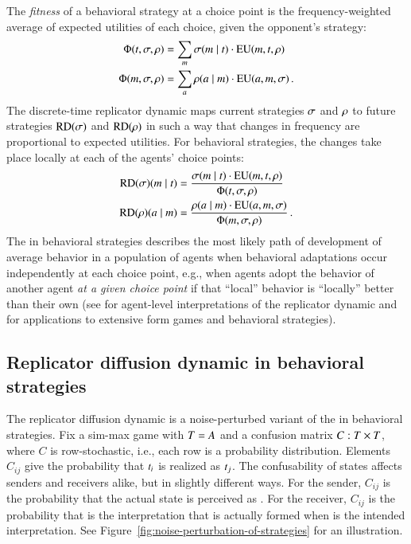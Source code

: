 \documentclass[fleqn,reqno,10pt]{article}
\newcommand{\rd}{\acro{rd}} %
\newcommand{\RD}{\ensuremath{\mathrm{RD}}} %
\begin{document}
The \emph{fitness} of a behavioral strategy at a choice point is the
frequency-weighted average of expected utilities of each choice, given
the opponent's strategy:
\begin{align*}
  \Phi(t,\sigma, \rho) & = \sum_{m} \sigma(m \mid t) \cdot
\mathrm{EU}(m, t,\rho) \\
\Phi(m,\sigma, \rho) & = \sum_{a} \rho(a \mid m)
\cdot \mathrm{EU}(a, m,\sigma)\,.
\end{align*}
The discrete-time replicator dynamic maps current strategies $\sigma$
and $\rho$ to future strategies $\RD(\Sstrat)$ and $\RD(\Rstrat)$
in such a way that changes in frequency are proportional to expected
utilities. For behavioral strategies, the changes take place locally
at each of the agents' choice points:
\begin{align*}
  \RD(\Sstrat)(\messg \probbar \state) & = \frac{\Sstrat(\messg \probbar \state) \cdot
    \EU(\messg, \state,\Rstrat)} {\Phi(\state,\Sstrat, \Rstrat)} \\
    \RD(\Rstrat)(\act \probbar \messg) & = \frac{\Rstrat(\act \probbar \messg) \cdot
    \EU(\act, \messg,\Sstrat)} {\Phi(\messg,\Sstrat, \Rstrat)}  \,.
\end{align*}
The \rd in behavioral strategies describes the most likely path of development of average
behavior in a population of agents when behavioral adaptations occur independently at each
choice point, e.g., when agents adopt the behavior of another agent \emph{at a given choice
  point} if that ``local'' behavior is ``locally'' better than their own (see
\cite{Sandholm2010:Population-Game} for agent-level interpretations of the replicator dynamic
and \citeauthor{Cressman2003:Evolutionary-Dy} \citeyear{Cressman2003:Evolutionary-Dy} for
applications to extensive form games and behavioral strategies).


\subsection{Replicator diffusion dynamic in behavioral strategies}
\label{sec:repl-diff-dynam-1}

The replicator diffusion dynamic is a noise-perturbed variant of the
\rd in behavioral strategies. Fix a sim-max game with $T =
A$ and a confusion matrix $C : T \times T$, where $C$ is
row-stochastic, i.e., each row is a probability
distribution. Elements $C_{ij}$ give the probability that $t_i$
is realized as $t_j$. The confusability of states affects senders
and receivers alike, but in slightly different ways. For the sender,
$C_{ij}$ is the probability that the actual state  is
perceived as . For the receiver, $C_{ij}$ is the
probability that  is the interpretation that is actually
formed when  is the intended interpretation.
See Figure~\ref{fig:noise-perturbation-of-strategies} for an illustration.
\end{document}
